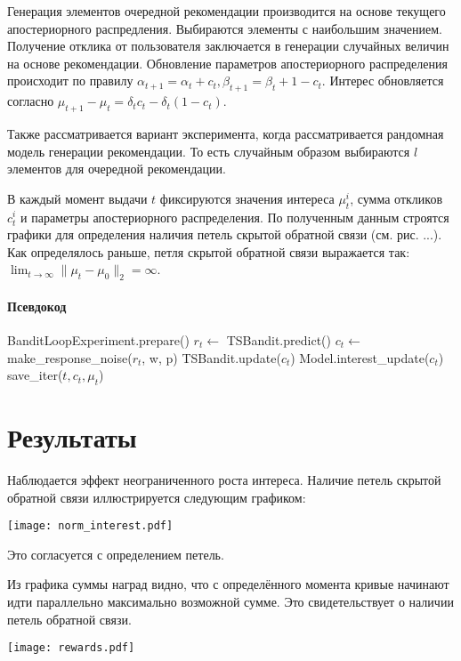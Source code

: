 \documentclass[12pt, twoside]{article}
\begin{document}
Генерация элементов очередной рекомендации производится на основе текущего апостериорного распредления. 
Выбираются элементы с наибольшим значением. 
Получение отклика от пользователя заключается в генерации случайных величин на основе рекомендации.
Обновление параметров апостериорного распределения происходит по правилу $\alpha_{t+1} = \alpha_t + c_t, \beta_{t+1} = \beta_t + 1 - c_t$. 
Интерес обновляется согласно 
$\mu_{t+1} - \mu_{t} = \delta_t c_t - \delta_t (1 - c_t)$.

Также рассматривается вариант эксперимента, когда рассматривается рандомная модель генерации рекомендации. То есть случайным образом выбираются $l$ элементов для очередной рекомендации. 

В каждый момент выдачи $t$ фиксируются значения интереса $\mu_t^i$, сумма откликов $c_t^i$ и параметры апостериорного распределения. 
По полученным данным строятся графики для определения наличия петель скрытой обратной связи (см. рис. ...).
Как определялось раньше, петля скрытой обратной связи выражается так: $\lim_{t \to \infty} \|\mu_t - \mu_0 \|_2 = \infty$.

\paragraph{Псевдокод}
\begin{algorithmic}
  \STATE BanditLoopExperiment.prepare()
    \STATE $r_t \leftarrow$ TSBandit.predict()
    \STATE $c_t \leftarrow$ make\_response\_noise($r_t$, w, p)
    \STATE TSBandit.update($c_t$)
    \STATE Model.interest\_update($c_t$)
    \STATE save\_iter($t, c_t, \mu_t$)
  \ENDFOR
\end{algorithmic}

\section{Результаты}
Наблюдается эффект неограниченного роста интереса. 
Наличие петель скрытой обратной связи иллюстрируется следующим графиком: 
\begin{center}
  \texttt{[image: norm\_interest.pdf]}
\end{center}
Это согласуется с определением петель. 

Из графика суммы наград видно, что с определённого момента кривые начинают идти параллельно максимально возможной сумме. 
Это свидетельствует о наличии петель обратной связи. 
\begin{center}
  \texttt{[image: rewards.pdf]}
\end{center}
\end{document}
